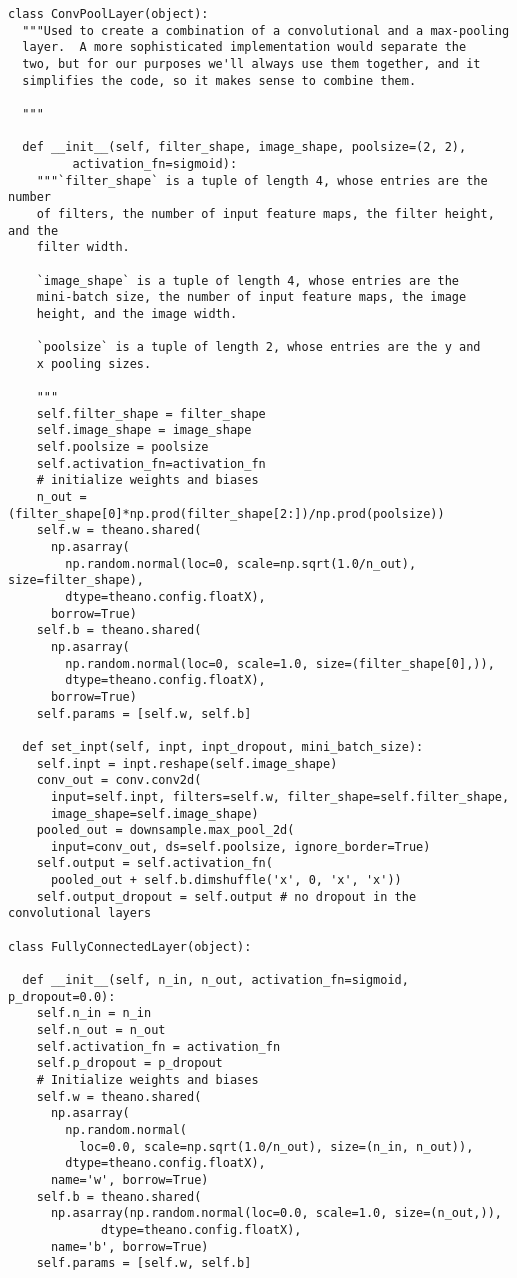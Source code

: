 \documentclass[a4paper,twoside,10pt]{book}
\begin{document}
\begin{lstlisting}
class ConvPoolLayer(object):
  """Used to create a combination of a convolutional and a max-pooling
  layer.  A more sophisticated implementation would separate the
  two, but for our purposes we'll always use them together, and it
  simplifies the code, so it makes sense to combine them.

  """

  def __init__(self, filter_shape, image_shape, poolsize=(2, 2),
         activation_fn=sigmoid):
    """`filter_shape` is a tuple of length 4, whose entries are the number
    of filters, the number of input feature maps, the filter height, and the
    filter width.

    `image_shape` is a tuple of length 4, whose entries are the
    mini-batch size, the number of input feature maps, the image
    height, and the image width.

    `poolsize` is a tuple of length 2, whose entries are the y and
    x pooling sizes.

    """
    self.filter_shape = filter_shape
    self.image_shape = image_shape
    self.poolsize = poolsize
    self.activation_fn=activation_fn
    # initialize weights and biases
    n_out = (filter_shape[0]*np.prod(filter_shape[2:])/np.prod(poolsize))
    self.w = theano.shared(
      np.asarray(
        np.random.normal(loc=0, scale=np.sqrt(1.0/n_out), size=filter_shape),
        dtype=theano.config.floatX),
      borrow=True)
    self.b = theano.shared(
      np.asarray(
        np.random.normal(loc=0, scale=1.0, size=(filter_shape[0],)),
        dtype=theano.config.floatX),
      borrow=True)
    self.params = [self.w, self.b]

  def set_inpt(self, inpt, inpt_dropout, mini_batch_size):
    self.inpt = inpt.reshape(self.image_shape)
    conv_out = conv.conv2d(
      input=self.inpt, filters=self.w, filter_shape=self.filter_shape,
      image_shape=self.image_shape)
    pooled_out = downsample.max_pool_2d(
      input=conv_out, ds=self.poolsize, ignore_border=True)
    self.output = self.activation_fn(
      pooled_out + self.b.dimshuffle('x', 0, 'x', 'x'))
    self.output_dropout = self.output # no dropout in the convolutional layers

class FullyConnectedLayer(object):

  def __init__(self, n_in, n_out, activation_fn=sigmoid, p_dropout=0.0):
    self.n_in = n_in
    self.n_out = n_out
    self.activation_fn = activation_fn
    self.p_dropout = p_dropout
    # Initialize weights and biases
    self.w = theano.shared(
      np.asarray(
        np.random.normal(
          loc=0.0, scale=np.sqrt(1.0/n_out), size=(n_in, n_out)),
        dtype=theano.config.floatX),
      name='w', borrow=True)
    self.b = theano.shared(
      np.asarray(np.random.normal(loc=0.0, scale=1.0, size=(n_out,)),
             dtype=theano.config.floatX),
      name='b', borrow=True)
    self.params = [self.w, self.b]


\end{lstlisting}
\end{document}
